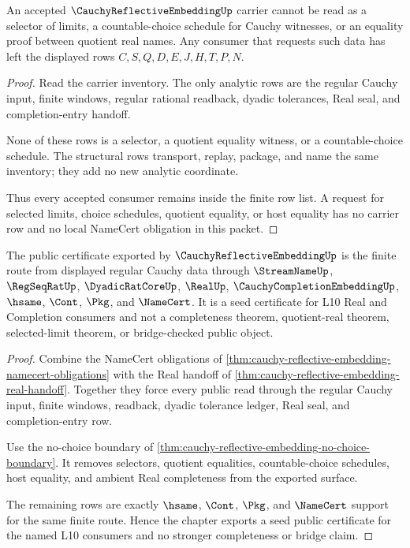 \begin{theorem}
\label{thm:cauchy-reflective-embedding-no-choice-boundary}
An accepted $\CauchyReflectiveEmbeddingUp$ carrier cannot be read as a selector of limits, a countable-choice schedule for Cauchy witnesses, or an equality proof between quotient real names. Any consumer that requests such data has left the displayed rows $C,S,Q,D,E,J,H,T,P,N$.
\end{theorem}
\begin{proof}
Read the carrier inventory. The only analytic rows are the regular Cauchy input, finite windows, regular rational readback, dyadic tolerances, Real seal, and completion-entry handoff.

None of these rows is a selector, a quotient equality witness, or a countable-choice schedule. The structural rows transport, replay, package, and name the same inventory; they add no new analytic coordinate.

Thus every accepted consumer remains inside the finite row list. A request for selected limits, choice schedules, quotient equality, or host equality has no carrier row and no local NameCert obligation in this packet.
\end{proof}

\begin{theorem}
\label{thm:cauchy-reflective-embedding-public-certificate}
The public certificate exported by $\CauchyReflectiveEmbeddingUp$ is the finite route from displayed regular Cauchy data through $\StreamNameUp$, $\RegSeqRatUp$, $\DyadicRatCoreUp$, $\RealUp$, $\CauchyCompletionEmbeddingUp$, $\hsame$, $\Cont$, $\Pkg$, and $\NameCert$. It is a seed certificate for L10 Real and Completion consumers and not a completeness theorem, quotient-real theorem, selected-limit theorem, or bridge-checked public object.
\end{theorem}
\begin{proof}
Combine the NameCert obligations of \autoref{thm:cauchy-reflective-embedding-namecert-obligations} with the Real handoff of \autoref{thm:cauchy-reflective-embedding-real-handoff}. Together they force every public read through the regular Cauchy input, finite windows, readback, dyadic tolerance ledger, Real seal, and completion-entry row.

Use the no-choice boundary of \autoref{thm:cauchy-reflective-embedding-no-choice-boundary}. It removes selectors, quotient equalities, countable-choice schedules, host equality, and ambient Real completeness from the exported surface.

The remaining rows are exactly $\hsame$, $\Cont$, $\Pkg$, and $\NameCert$ support for the same finite route. Hence the chapter exports a seed public certificate for the named L10 consumers and no stronger completeness or bridge claim.
\end{proof}

